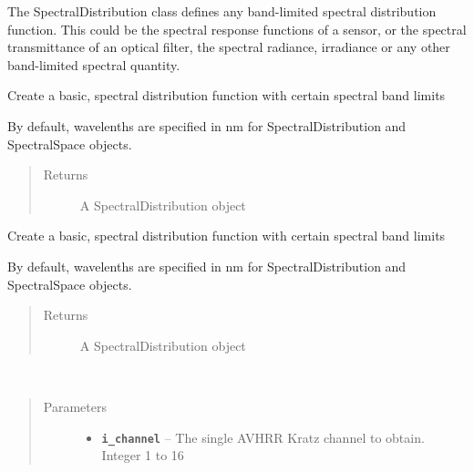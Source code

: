 \documentclass[a4paper,10pt,english]{sphinxmanual}
\begin{document}
\begin{fulllineitems}
\label{packages:radute.SpectralDistribution}
The SpectralDistribution class defines any band-limited spectral distribution function. This could be
the spectral response functions of a sensor, or the spectral transmittance of an optical filter, the spectral
radiance, irradiance or any other band-limited spectral quantity.

Create a basic, spectral distribution function with certain spectral band limits

By default, wavelenths are specified in nm for SpectralDistribution and SpectralSpace objects.
\begin{quote}\begin{description}
\item[{Returns}] \leavevmode
A SpectralDistribution object

\end{description}\end{quote}

\begin{fulllineitems}
\label{packages:radute.SpectralDistribution.__init__}
Create a basic, spectral distribution function with certain spectral band limits

By default, wavelenths are specified in nm for SpectralDistribution and SpectralSpace objects.
\begin{quote}\begin{description}
\item[{Returns}] \leavevmode
A SpectralDistribution object

\end{description}\end{quote}

\end{fulllineitems}


\begin{fulllineitems}
\label{packages:radute.SpectralDistribution.avhrr_kratz}~\begin{quote}\begin{description}
\item[{Parameters}] \leavevmode\begin{itemize}
\item {} 
\textbf{\texttt{i\_channel}} -- The single AVHRR Kratz channel to obtain. Integer 1 to 16


\end{itemize}
\end{description}
\end{quote}
\end{fulllineitems}
\end{fulllineitems}
\end{document}
